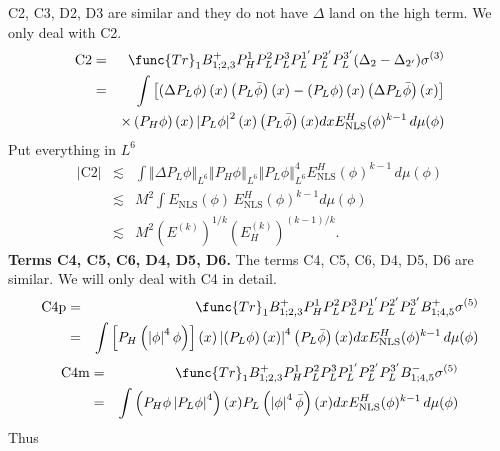 \documentclass[12pt,letterpaper,leqno]{amsart}
\theoremstyle{plain}
\numberwithin{equation}{section}
\numberwithin{theorem}{section}
\numberwithin{proposition}{section}
\numberwithin{lemma}{section}
\numberwithin{corollary}{section}
\begin{document}
C2, C3, D2, D3 are similar and they do not have $\Delta $ land on the high
term. We only deal with C2.%
\begin{eqnarray*}
\text{C2} &=&\func{Tr}_{1}B_{1;2,3}^{+}P_{H}^{1}P_{L}^{2}P_{L}^{3}P_{L}^{1^{%
\prime }}P_{L}^{2^{\prime }}P_{L}^{3^{\prime }}(\Delta _{2}-\Delta
_{2^{\prime }})\sigma ^{(3)} \\
&=&\int \left[ \left( \Delta P_{L}\phi \right) (x)\left( P_{L}\bar{\phi}%
\right) (x)-\left( P_{L}\phi \right) (x)\left( \Delta P_{L}\bar{\phi}\right)
(x)\right] \\
&&\times \left( P_{H}\phi \right) (x)\left\vert P_{L}\phi \right\vert
^{2}(x)\left( P_{L}\bar{\phi}\right) (x)dxE_{\text{NLS}}^{H}(\phi
)^{k-1}\,d\mu (\phi )
\end{eqnarray*}%
Put everything in $L^{6}$%
\begin{eqnarray*}
\left\vert \text{C2}\right\vert &\lesssim &\int \left\Vert \Delta P_{L}\phi
\right\Vert _{L^{6}}\left\Vert P_{H}\phi \right\Vert _{L^{6}}\left\Vert
P_{L}\phi \right\Vert _{L^{6}}^{4}E_{\text{NLS}}^{H}(\phi )^{k-1}\,d\mu
(\phi ) \\
&\lesssim &M^{2}\int E_{\text{NLS}}(\phi )\,E_{\text{NLS}}^{H}(\phi
)^{k-1}d\mu (\phi ) \\
&\lesssim &M^{2}(E^{(k)})^{1/k}(E_{H}^{(k)})^{(k-1)/k}.
\end{eqnarray*}%
\textbf{Terms C4, C5, C6, D4, D5, D6. }The terms C4, C5, C6, D4, D5, D6 are
similar. We will only deal with C4 in detail.%
\begin{eqnarray*}
\text{C4p} &=&\func{Tr}%
_{1}B_{1;2,3}^{+}P_{H}^{1}P_{L}^{2}P_{L}^{3}P_{L}^{1^{\prime
}}P_{L}^{2^{\prime }}P_{L}^{3^{\prime }}B_{1;4,5}^{+}\sigma ^{(5)} \\
&=&\int \left[ P_{H}\left( \left\vert \phi \right\vert ^{4}\phi \right) %
\right] (x)\left\vert \left( P_{L}\phi \right) (x)\right\vert ^{4}\left(
P_{L}\bar{\phi}\right) (x)dxE_{\text{NLS}}^{H}(\phi )^{k-1}\,d\mu (\phi )
\end{eqnarray*}%
\begin{eqnarray*}
\text{C4m} &=&\func{Tr}%
_{1}B_{1;2,3}^{+}P_{H}^{1}P_{L}^{2}P_{L}^{3}P_{L}^{1^{\prime
}}P_{L}^{2^{\prime }}P_{L}^{3^{\prime }}B_{1;4,5}^{-}\sigma ^{(5)} \\
&=&\int \left( P_{H}\phi \left\vert P_{L}\phi \right\vert ^{4}\right)
(x)P_{L}\left( \left\vert \phi \right\vert ^{4}\bar{\phi}\right) (x)dxE_{%
\text{NLS}}^{H}(\phi )^{k-1}\,d\mu (\phi )
\end{eqnarray*}%
Thus%
\end{document}
